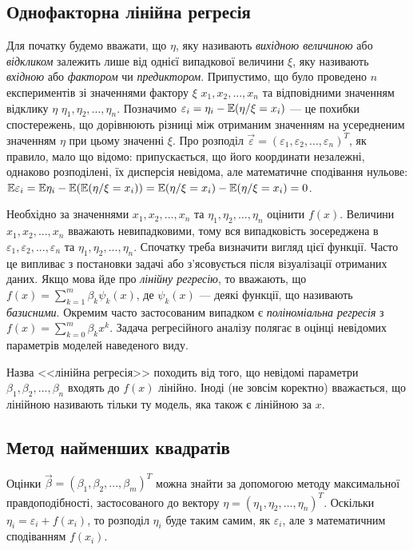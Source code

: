 \subsection{Однофакторна лінійна регресія}
Для початку будемо вважати, що $\eta$, яку називають \emph{вихідною величиною} або \emph{відкликом} залежить лише від однієї випадкової величини $\xi$,
яку називають \emph{вхідною} або \emph{фактором} чи \emph{предиктором}. Припустимо,
що було проведено $n$ експериментів зі значеннями фактору $\xi$ $x_1, x_2, ..., x_n$ та відповідними
значенням відклику $\eta$ $\eta_1, \eta_2, ..., \eta_n$. Позначимо
$\varepsilon_i = \eta_i - \mathbb{E}(\eta / \xi = x_i)$ --- це похибки спостережень, що дорівнюють різниці
між отриманим значенням на усередненим значенням $\eta$ при цьому значенні $\xi$.
Про розподіл $\vec{\varepsilon} = (\varepsilon_1, \varepsilon_2, ..., \varepsilon_n)^T$, як правило, мало що відомо:
припускається, що його координати незалежні, однаково розподілені, їх дисперсія невідома, але математичне сподівання нульове:
$\mathbb{E}\varepsilon_i = \mathbb{E}\eta_i - \mathbb{E}(\mathbb{E}(\eta / \xi = x_i)) = \mathbb{E}(\eta / \xi = x_i) - \mathbb{E}(\eta / \xi = x_i) = 0$.

Необхідно за значеннями $x_1, x_2, ..., x_n$ та $\eta_1, \eta_2, ..., \eta_n$ оцінити $f(x)$.
Величини $x_1, x_2, ..., x_n$ вважають невипадковими, тому вся випадковість зосереджена в
$\varepsilon_1, \varepsilon_2, ..., \varepsilon_n$ та $\eta_1, \eta_2, ..., \eta_n$.
Спочатку треба визначити вигляд цієї функції. Часто це випливає з постановки задачі або з'ясовується після візуалізації отриманих даних.
Якщо мова йде про \emph{лінійну регресію}, то вважають, що
$f(x) = \sum\limits_{k=1}^m \beta_k \psi_k(x)$, де $\psi_k(x)$ --- деякі функції, що називають \emph{базисними}.
Окремим часто застосованим випадком є \emph{поліноміальна регресія} з
$f(x) = \sum\limits_{k=0}^m \beta_k x^k$. Задача регресійного аналізу полягає в оцінці невідомих параметрів моделей наведеного виду.
\begin{remark}
    Назва <<лінійна регресія>> походить від того, що невідомі параметри $\beta_1, \beta_2, ..., \beta_n$ входять до $f(x)$ лінійно.
    Іноді (не зовсім коректно) вважається, що лінійною називають тільки ту модель, яка також
    є лінійною за $x$.
\end{remark}

\subsection{Метод найменших квадратів}
Оцінки $\vec{\beta} = (\beta_1, \beta_2, ..., \beta_m)^T$ можна знайти за допомогою методу максимальної правдоподібності,
застосованого до вектору $\eta = \left(\eta_1, \eta_2, ..., \eta_n\right)^T$.
Оскільки $\eta_i = \varepsilon_i + f(x_i)$, то розподіл $\eta_i$ буде таким самим, як 
$\varepsilon_i$, але з математичним сподіванням $f(x_i)$.

